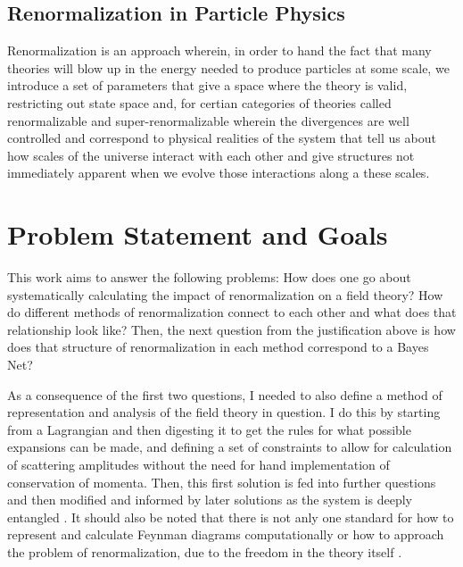 \documentclass{article}
\begin{document}
\subsection{Renormalization in Particle Physics}
Renormalization is an approach wherein, in order to hand the fact that many theories will blow up in the energy needed to produce particles at some scale, we introduce a set of parameters that give a space where the theory is valid, restricting out state space and, for certian categories of theories called renormalizable and super-renormalizable wherein the divergences are well controlled and correspond to physical realities of the system that tell us about how scales of the universe interact with each other and give structures not immediately apparent when we evolve those interactions along a these scales. 

\section{Problem Statement and Goals}
\hspace{0.5 cm} This work aims to answer the following problems: How does one go about systematically calculating the impact of renormalization on a field theory? How do different methods of renormalization connect to each other and what does that relationship look like?
Then, the next question from the justification above is how does that structure of renormalization in each method correspond to a Bayes Net?

\hspace{0.5 cm} As a consequence of the first two questions, I needed to also define a method of representation and analysis of the field theory in question. 
I do this by starting from a Lagrangian and then digesting it to get the rules for what possible expansions can be made, and defining a set of constraints to allow for calculation of scattering amplitudes without the need for hand implementation of conservation of momenta. 
Then, this first solution is fed into further questions and then modified and informed by later solutions as the system is deeply entangled \cite{PS}. 
It should also be noted that there is not anly one standard for how to represent and calculate Feynman diagrams computationally  \cite{Harlander1999} \cite{2009} \cite{Hodeges1990} \cite{TODOROV1971} \cite{BILENKY1974} or how to approach the problem of renormalization, due to the freedom in the theory itself \cite{Myers1996}\cite{Hansenfratz2019}\cite{Bednayakov2016} \cite{Carfora2010} 
\cite{Fabinao2022} \cite{Binosi2020}\cite{Sonoda2021}\cite{Aharony2019} \cite{Alekseev2005}. 
\end{document}

